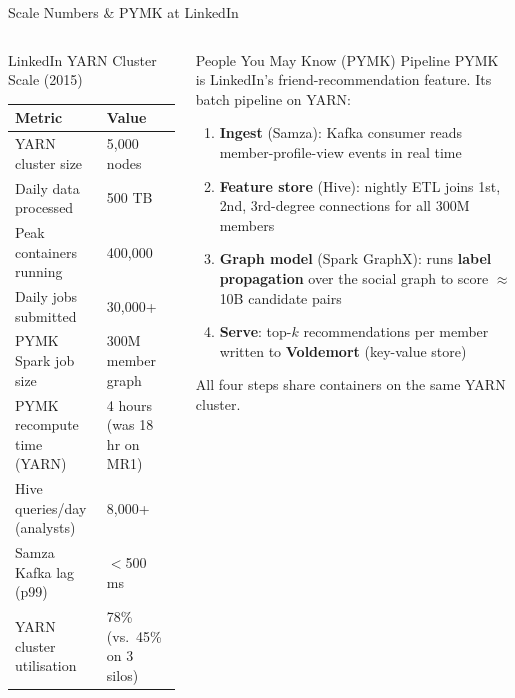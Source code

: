 \documentclass[aspectratio=169,10pt]{beamer}
\begin{document}
\begin{frame}{Scale Numbers \& PYMK at LinkedIn}
  \begin{columns}[T]
      \begin{block}{LinkedIn YARN Cluster Scale (2015)}
        \renewcommand{\arraystretch}{1.3}
        \begin{tabular}{@{}ll@{}}
          \toprule
          \textbf{Metric}             & \textbf{Value} \\
          \midrule
          YARN cluster size           & 5{,}000 nodes \\
          Daily data processed        & 500 TB \\
          Peak containers running     & 400{,}000 \\
          Daily jobs submitted        & 30{,}000+ \\
          PYMK Spark job size         & 300M member graph \\
          PYMK recompute time (YARN)  & 4 hours (was 18 hr on MR1) \\
          Hive queries/day (analysts) & 8{,}000+ \\
          Samza Kafka lag (p99)       & $<$500 ms \\
          YARN cluster utilisation    & 78\% (vs.\ 45\% on 3 silos) \\
          \bottomrule
        \end{tabular}
      \end{block}

      \begin{exampleblock}{People You May Know (PYMK) Pipeline}
        PYMK is LinkedIn's friend-recommendation feature.
        Its batch pipeline on YARN:
        \begin{enumerate}\setlength\itemsep{2pt}
          \item \textbf{Ingest} (Samza): Kafka consumer reads
                member-profile-view events in real time
          \item \textbf{Feature store} (Hive): nightly ETL joins
                1st, 2nd, 3rd-degree connections for all 300M members
          \item \textbf{Graph model} (Spark GraphX): runs
                \textbf{label propagation} over the social graph
                to score $\approx$10B candidate pairs
          \item \textbf{Serve}: top-$k$ recommendations per member
                written to \textbf{Voldemort} (key-value store)
        \end{enumerate}
        All four steps share containers on the same YARN cluster.
      \end{exampleblock}
  \end{columns}
\end{frame}
\end{document}
